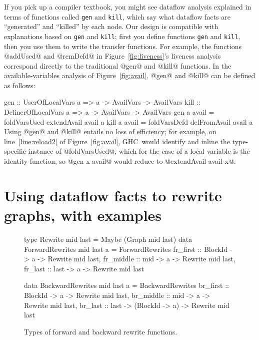 \documentclass[blockstyle,preprint,natbib,nocopyrightspace]{sigplanconf}
\newenvironment{smallcode}{\par\unskip\small\verbatim}{\endverbatim}
\newcommand\lineref[1]{line~\ref{line:#1}}
\newcommand{\authornote}[1]{{\em #1}}
\def\authornote#1{\unskip\relax}
\newcommand{\simon}[1]{\authornote{SLPJ: #1}}
\newcommand\seclabel[1]{\label{sec:#1}}
\newcommand\figref[1]{Figure~\ref{fig:#1}}
\newcommand\figlabel[1]{\label{fig:#1}}
\begin{document}
If you pick up a compiler textbook, you might see dataflow
analysis explained in terms of functions called \texttt{gen} and
\texttt{kill}, 
which say what dataflow facts are ``generated'' and
``killed'' by each node.
Our design is compatible with explanations based on \texttt{gen} and
\texttt{kill};
first you define functions \texttt{gen} and \texttt{kill}, then you
use them to write the transfer functions.
For example, the functions @addUsed@ and @remDefd@ in \figref{liveness}'s
liveness analysis correspond directly to the traditional @gen@ and
@kill@ functions.
In the available-variables analysis of \figref{avail}, @gen@ and
@kill@ can be defined as follows:
\begin{smallcode}
gen  :: UserOfLocalVars    a => a -> AvailVars -> AvailVars
kill :: DefinerOfLocalVars a => a -> AvailVars -> AvailVars
gen  a avail = foldVarsUsed extendAvail  avail a
kill a avail = foldVarsDefd delFromAvail avail a
\end{smallcode}
Using @gen@ and @kill@ entails no loss of efficiency;
for example, on \lineref{reload2} of \figref{avail}, GHC~would 
\ifpagetuning\else identify and \fi
inline the type-specific instance of @foldVarsUsed@, which for 
\ifpagetuning\else the case of \fi
a local variable is the identity function, so @gen x avail@
would reduce to @extendAvail avail x@.
\simon{But that's what line 17 already says!  
I suggest that we actually give the code for the implementation of forward 
transfers in terms of gen and kill, rather than hoping the reader
can construct it in their head.}
\fi

\section{Using dataflow facts to rewrite graphs\ifpagetuning\else, with examples\fi}

\seclabel{rewrites}

\seclabel{example-rewrites}

\begin{figure}
\begin{code}
type Rewrite mid last = Maybe (Graph mid last)
data ForwardRewrites mid last a = ForwardRewrites
 {fr_first  :: BlockId -> a -> Rewrite mid last,
  fr_middle :: mid     -> a -> Rewrite mid last,
  fr_last   :: last    -> a -> Rewrite mid last} 

data BackwardRewrites mid last a = BackwardRewrites
 {br_first  :: BlockId  -> a  -> Rewrite mid last,
  br_middle :: mid      -> a  -> Rewrite mid last,
  br_last   :: last ->
               (BlockId -> a) -> Rewrite mid last} 
\end{code}
\caption{Types of forward and backward rewrite functions.}
\figlabel{rewrites}
\end{figure}
\end{document}
